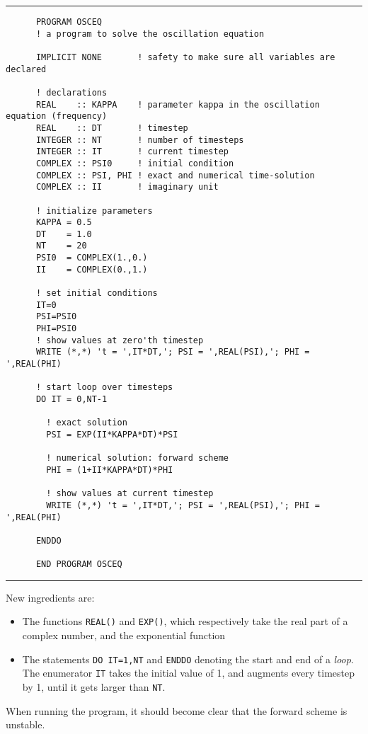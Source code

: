 \documentclass[a4paper]{article}
\begin{document}
{\vspace{10pt}\hrule\small\vspace*{-2pt}\begin{verbatim}
	  PROGRAM OSCEQ
	  ! a program to solve the oscillation equation

	  IMPLICIT NONE       ! safety to make sure all variables are declared

	  ! declarations
	  REAL    :: KAPPA    ! parameter kappa in the oscillation equation (frequency)
	  REAL    :: DT       ! timestep
	  INTEGER :: NT       ! number of timesteps
	  INTEGER :: IT       ! current timestep
	  COMPLEX :: PSI0     ! initial condition
	  COMPLEX :: PSI, PHI ! exact and numerical time-solution
	  COMPLEX :: II       ! imaginary unit

	  ! initialize parameters
	  KAPPA = 0.5
	  DT    = 1.0
	  NT    = 20
	  PSI0  = COMPLEX(1.,0.)
	  II    = COMPLEX(0.,1.)

	  ! set initial conditions
	  IT=0
	  PSI=PSI0
	  PHI=PSI0
	  ! show values at zero'th timestep
	  WRITE (*,*) 't = ',IT*DT,'; PSI = ',REAL(PSI),'; PHI = ',REAL(PHI)

	  ! start loop over timesteps
	  DO IT = 0,NT-1
	  
	    ! exact solution
	    PSI = EXP(II*KAPPA*DT)*PSI

	    ! numerical solution: forward scheme
	    PHI = (1+II*KAPPA*DT)*PHI

	    ! show values at current timestep
	    WRITE (*,*) 't = ',IT*DT,'; PSI = ',REAL(PSI),'; PHI = ',REAL(PHI)

	  ENDDO

	  END PROGRAM OSCEQ
\end{verbatim}\hrule\vspace{5pt}}
%
\par
New ingredients are:
%
\begin{itemize}
	\item The functions \verb+REAL()+ and \verb+EXP()+, which respectively take the real part of a complex number, and the exponential function
	\item The statements \verb+DO IT=1,NT+ and \verb+ENDDO+ denoting the start and end of a \emph{loop}. The enumerator \verb+IT+ takes the initial value of 1, and augments every timestep by 1, until it gets larger than \verb+NT+.
\end{itemize}
%
\par
When running the program, it should become clear that the forward scheme is unstable.
%
\end{document}
